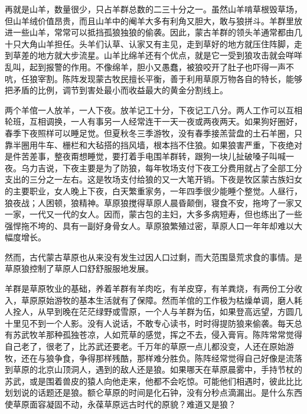 \par 再就是山羊，数量很少，只占羊群总数的二三十分之一。虽然山羊啃草根毁草场，但山羊绒价值昂贵，而且山羊中的阉羊大多有利角又胆大，敢与狼拼斗。羊群里放进一些山羊，常常可以抵挡孤狼独狼的偷袭。因此，蒙古羊群的领头羊通常都由几十只大角山羊担任。头羊们认草、认家又有主见，走到草好的地方就压住阵脚，走到草差的地方就大步流星。山羊比绵羊还有个优点，就是它一受到狼攻击就会咩咩乱叫，起到报警的作用。不像绵羊，胆小又愚蠢，被狼咬开了肚子也吓得一声不吭，任狼宰割。陈阵发现蒙古牧民擅长平衡，善于利用草原万物各自的特长，能够把矛盾的比例，调节到害处最小而收益最大的黄金分割线上。
\par 两个羊倌一人放羊，一人下夜。放羊记工十分，下夜记工八分。两人工作可以互相轮班，互相调换，一人有事另一人经常连干一天一夜或两夜两天。如果狗好圈好，春季下夜照样可以睡足觉。但夏秋冬三季游牧，没有春季接羔营盘的土石羊圈，只靠半圈用牛车、栅栏和大毡搭的挡风墙，根本挡不住狼。如果狼害严重，下夜绝对是件苦差事，整夜甭想睡觉，要打着手电围羊群转，跟狗一块儿扯破嗓子叫喊一夜。乌力吉说，下夜主要是为了防狼，每年牧场支付下夜工分费用就占了全部工分支出的三分之一左右。这是牧场支付给狼的又一大笔开销。下夜是牧区蒙古族妇女的主要职业，女人晚上下夜，白天繁重家务，一年四季很少能睡个整觉。人昼行，狼夜战；人困顿，狼精神。草原狼搅得草原人晨昏颠倒，寝食不安，拖垮了一家又一家，一代又一代的女人。因而，蒙古包的主妇，大多多病短寿，但也练出了一些强悍拖不垮的、具有一副好身骨女人。草原狼繁殖过密，草原人口一年年却难以大幅度增长。
\par 然而，古代蒙古草原也从来没有发生过因人口过剩，而大范围垦荒求食的事情。是草原狼控制了草原人口舒舒服服地发展。
\par 羊群是草原牧业的基础，养着羊群有羊肉吃，有羊皮穿，有羊粪烧，有两份工分收入，草原原始游牧的基本生活就有了保障。然而羊倌的工作极为枯燥单调，磨人耗人拴人，从早到晚在茫茫绿野或雪原，一个人与羊群为伍，如果登高远望，方圆几十里见不到一个人影。没有人说话，不敢专心读书，时时得提防狼来偷袭。每天总有苏武牧羊那种孤独苍凉，人如荒草的感觉，挥之不去，侵入膏肓。陈阵常常觉得自己老了，很老了，比苏武还要老。千万年的草原一点儿都没变，人还在原始游牧，还在与狼争食，争得那样残酷，那样难分胜负。陈阵经常觉得自己好像是流落到草原的北京山顶洞人，遇到的敌人还是狼。如果哪天在草原晨雾中，手持节杖的苏武，或是围着兽皮的猿人向他走来，他都不会吃惊。可能他们相遇时，彼此比比划划说的话题还是狼。额仑草原的时间是化石钟，没有分秒点滴漏出。是什么东西使草原面容凝固不动，永葆草原远古时代的原貌？难道又是狼？
\par 
